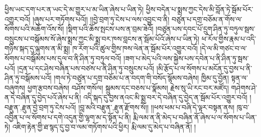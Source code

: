 ཕྱིས་ཡང་དག་པར་ན་ཡང་དེ་མ་གྱུར་པ་མ་ཡིན་ཞེས་པ་ཡིན་ཏེ། ཕྱིས་བདེན་པ་སྨྲས་ཀྱང་དེས་མི་བློན་ཏེ་སྦོམ་པོར་འགྱུར་བའོ། །ཞུས་པར་གཏོགས་པའོ།། །།བྱེ་བྲག་ཏུ་ངེས་པ་ལས་འབྱུང་བ་ནི། བཙུན་པ་དགྲ་བཅོམ་ན་གོས་ལ་སོགས་པའི་མཆོག་འོས་སོ། །སྡིག་པའི་ཆོས་སྤངས་པས་ན་བྲམ་ཟེའོ། །བཙུན་པས་དབང་པོ་དྲུག་ཤིན་ཏུ་བཏུལ་སྦས་བསྲུངས་པ་བསྒོམས་སོ་ཞེས་སྨྲས་ཀྱང་མི་སྨྲ་བར་ཁས་བླངས་ན་སྦོམ་པོའོ་ཞེས་པ་ཡིན་ཏེ། ཕ་རོལ་གྱིས་རྣམ་པ་འདི་གཉིས་སྐད་དུ་ལྐུགས་ན་མི་སྨྲ། ཁ་རོག་པའི་ཚུལ་གྱིས་ཁས་ལེན་ན་སྦོམ་པོར་འགྱུར་བའོ། །དེ་ལ་མི་གཙང་བ་ལ་སོགས་པ་བསྒོམས་པས་དུལ་བ་ནི་ཤིན་ཏུ་བཏུལ་བའོ། །ཟག་པ་མེད་པའི་ལས་སྐྱེས་པས་དབེན་པ་ནི་ཤིན་ཏུ་སྦས་པའོ། །དྲན་པ་དང་ཤེས་བཞིན་པས་བཙས་པ་ནི་ཤིན་ཏུ་བསྲུངས་པའོ། །མི་རྩོད་པ་ལ་སོགས་པ་མངོན་དུ་བྱས་པ་ནི་ཤིན་ཏུ་བསྒོམས་པའོ། །གལ་ཏེ་བཙུན་པ་དགྲ་བཅོམ་པ་ན་བདག་གི་བསོད་སྙོམས་བཞེས། ཁྱིམ་དུ་བྱོན། སྟན་ལ་བཞུགས། ཕྱག་རྩབས་བཞེས། བཤོས་གསོལ། སྐྲུམས་དང་བཅས་པ་སྣོམས། རྗེས་སུ་ཡི་རང་བར་མཛོད། གཤེགས་ཤེ་ན་དེ་བཞིན་དུ་བྱེད་པའོ་ཞེས་པ་ནི། འདི་སྐད་དུ་བྱས་ནའང་མི་སྨྲ་བར་དེ་བཞིན་དུ་བྱེད་ན་སྦོམ་པོར་འགྱུར་བའོ། །{བརྫུན་,རྫུན་}བྱེ་བྲག་ཏུ་ངེས་པའོ། །བླ་མའི་{བརྫུན་,རྫུན་}རྫོགས་སོ།། །།ཕས་ཕམ་པ་བཞི་དེ་ལྟར་བསྟན་ནས། ཁུ་བ་འབྱིན་པ་ལ་སོགས་པ་དགེ་འདུན་གྱི་ལྷག་མ་ད་སྟོན་པ་ནི། རྨི་ལམ་ན་ནི་མེད་པ་བཞིན་ནོ་ཞེས་པ་ལ་སོགས་པ་ཡིན་ཏེ། འཇིག་རྟེན་གྱི་ཐ་སྙད་དུ་བྱ་བ་ལམ་གཏོགས་པའི་ཕྱིར། རྨི་ལམ་དུ་མེད་པ་བཞིན་ནོ། །
